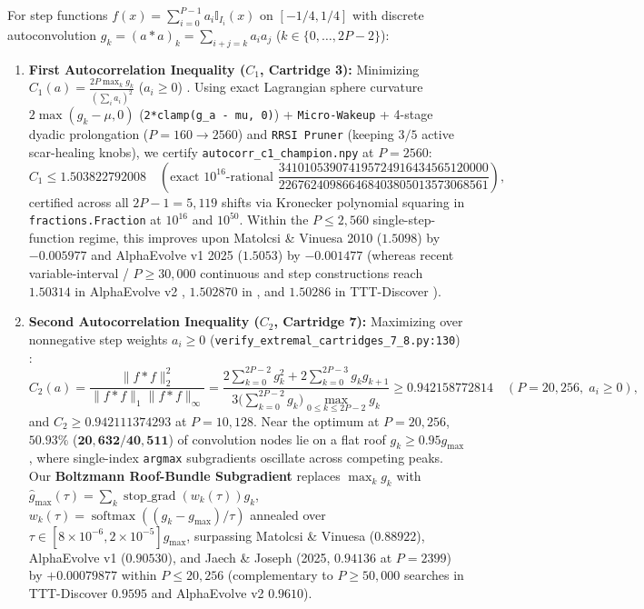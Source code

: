 \documentclass[11pt,a4paper]{article}
\begin{document}
For step functions $f(x) = \sum_{i=0}^{P-1} a_i \mathbb{I}_{I_i}(x)$ on $[-1/4, 1/4]$ with discrete autoconvolution $g_k = (a * a)_k = \sum_{i+j=k} a_i a_j$ ($k \in \{0, \dots, 2P-2\}$):
\begin{enumerate}
\item \textbf{First Autocorrelation Inequality ($C_1$, Cartridge 3):} Minimizing $C_1(a) = \frac{2P \max_k g_k}{(\sum_i a_i)^2}$ ($a_i \ge 0$) \cite{matolcsi2010}. Using exact Lagrangian sphere curvature $2\max(g_k - \mu, 0)$ (\texttt{2*clamp(g\_a - mu, 0)}) + \texttt{Micro-Wakeup} + 4-stage dyadic prolongation ($P=160 \to 2560$) and \texttt{RRSI Pruner} (keeping $3/5$ active scar-healing knobs), we certify \texttt{autocorr\_c1\_champion.npy} at $P=2560$:
\begin{equation}
C_1 \le \mathbf{1.503822792008} \quad \left(\text{exact } 10^{16}\text{-rational } \frac{341010539074195724916434565120000}{226762409866468403805013573068561}\right),
\tag{20}\label{eq:c1_bound}
\end{equation}
certified across all $2P-1 = 5,119$ shifts via Kronecker polynomial squaring in \texttt{fractions.Fraction} at $10^{16}$ and $10^{50}$. Within the $P \le 2,560$ single-step-function regime, this improves upon Matolcsi \& Vinuesa 2010 ($1.5098$) by $-0.005977$ and AlphaEvolve v1 2025 ($1.5053$) by $-0.001477$ (whereas recent variable-interval / $P \ge 30,000$ continuous and step constructions reach $1.50314$ in AlphaEvolve v2 \cite{alphaevolve2_2025}, $1.502870$ in \cite{khrulkov2026}, and $1.50286$ in TTT-Discover \cite{tttdiscover2026}).
\item \textbf{Second Autocorrelation Inequality ($C_2$, Cartridge 7):} Maximizing over nonnegative step weights $a_i \ge 0$ (\texttt{verify\_extremal\_cartridges\_7\_8.py:130}) \cite{jaech2025}:
\begin{equation}
C_2(a) = \frac{\|f*f\|_2^2}{\|f*f\|_1 \|f*f\|_\infty} = \frac{2\sum_{k=0}^{2P-2} g_k^2 + 2\sum_{k=0}^{2P-3} g_k g_{k+1}}{3\bigl(\sum_{k=0}^{2P-2} g_k\bigr)\max_{0 \le k \le 2P-2} g_k} \ge \mathbf{0.942158772814} \quad (P = 20,256,\; a_i \ge 0),
\tag{21}\label{eq:c2_bound}
\end{equation}
and $C_2 \ge \mathbf{0.942111374293}$ at $P = 10,128$. Near the optimum at $P = 20,256$, $\mathbf{50.93\%}$ ($\mathbf{20,632 / 40,511}$) of convolution nodes lie on a flat roof $g_k \ge 0.95 g_{\max}$, where single-index \texttt{argmax} subgradients oscillate across competing peaks. Our \textbf{Boltzmann Roof-Bundle Subgradient} replaces $\max_k g_k$ with $\widehat{g}_{\max}(\tau) = \sum_k \operatorname{stop\_grad}(w_k(\tau)) g_k$, $w_k(\tau) = \operatorname{softmax}((g_k - g_{\max})/\tau)$ annealed over $\tau \in [8\times 10^{-6}, 2\times 10^{-5}] g_{\max}$, surpassing Matolcsi \& Vinuesa ($0.88922$), AlphaEvolve v1 ($0.90530$), and Jaech \& Joseph (2025, $0.94136$ at $P=2399$) by $\mathbf{+0.00079877}$ within $P \le 20,256$ (complementary to $P \ge 50,000$ searches in TTT-Discover \cite{tttdiscover2026} $0.9595$ and AlphaEvolve v2 \cite{alphaevolve2_2025} $0.9610$).

\end{enumerate}
\end{document}
